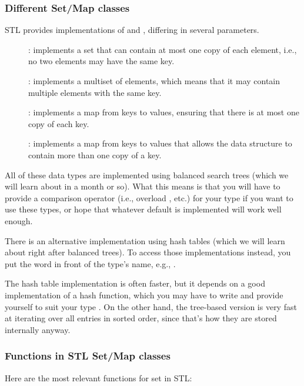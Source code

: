 \subsubsection{Different Set/Map classes}
STL provides implementations of  and , differing
in several parameters.
\begin{description}				
\item[]: implements a set that can contain at most one
  copy of each element, i.e., no two elements may have the same key.
\item[]: implements a multiset of elements, which
  means that it may contain multiple elements with the same key.
\item[]: implements a map from keys to values, ensuring
  that there is at most one copy of each key.
\item[]: implements a map from keys to values that
  allows the data structure to contain more than one copy of a key.
\end{description}

All of these data types are implemented using balanced search trees
(which we will learn about in a month or so). 
What this means is that you will have to provide a comparison operator
(i.e., overload \code{<=}, \code{<} etc.)
for your type  if you want to use these types, or hope that
whatever default is implemented will work well enough.

There is an alternative implementation using hash tables (which we
will learn about right after balanced trees). 
To access those implementations instead, you put the word 
 in front of the type's name, e.g.,
.

The hash table implementation is often faster, but it depends on a
good implementation of a hash function, which you may have to write
and provide yourself to suit your type .
On the other hand, the tree-based version is very fast at iterating
over all entries in sorted order, since that's how they are stored
internally anyway.

\subsubsection{Functions in STL Set/Map classes}
Here are the most relevant functions for set in STL:

